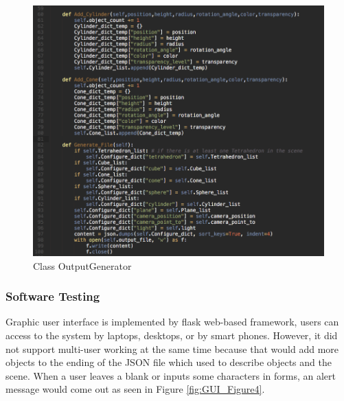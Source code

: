 \documentclass[a4paper, 12pt]{article}
\begin{document}
\begin{figure}[htb]
\centering
\includegraphics[width=12cm]{GUI_Figure3.png}
\caption{Class OutputGenerator}
\label{fig:OutputGenerator}
\end{figure}

\subsubsection{Software Testing}
Graphic user interface is implemented by flask web-based framework, users can access to the system by laptops, desktops, or by smart phones. However, it did not support multi-user working at the same time because that would add more objects to the ending of the JSON file which used to describe objects and the scene. When a user leaves a blank or inputs some characters in forms, an alert message would come out as seen in Figure \ref{fig:GUI_Figure4}.
\end{document}
